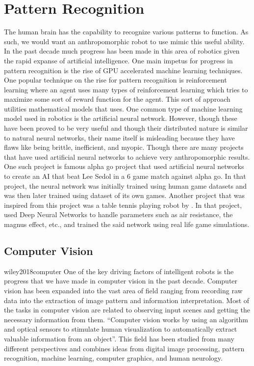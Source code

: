 \documentclass[conference]{IEEEtran}
\begin{document}
\section{Pattern Recognition}
The human brain has the capability to recognize various patterns to function. As such, we would want an anthropomorphic robot to use mimic this useful ability. In the past decade much progress has been made in this area of robotics given the rapid expanse of artificial intelligence. One main impetus for progress in pattern recognition is the rise of GPU accelerated machine learning techniques. One popular technique on the rise for pattern recognition is reinforcement learning where an agent uses many types of reinforcement learning which tries to maximize some sort of reward function for the agent. This sort of approach utilities mathematical models that uses. One common type of machine learning model used in robotics is the artificial neural network. However, though these have been proved to be very useful and though their distributed nature is similar to natural neural networks, their name itself is misleading because they have flaws like being brittle, inefficient, and myopic\autocite{Watson2019}. Though there are many projects that have used artificial neural networks to achieve very anthropomorphic results. One such project is famous alpha go project that used artificial neural networks to create an AI that beat Lee Sedol in a 6 game match against alpha go\autocite{silver2017mastering}. In that project, the neural network was initially trained using human game datasets and was then later trained using dataset of its own games\autocite{silver2017mastering}. Another project that was inspired from this project was a table tennis playing robot by \textcite{lin2020}. In that project, \textcite{lin2020} used Deep Neural Networks to handle parameters such as air resistance, the magnus effect, etc., and trained the said network using real life game simulations.

\subsection{Computer Vision}
wiley2018computer
One of the key driving factors of intelligent robots is the progress that we have made in computer vision in the past decade. Computer vision has been expanded into the vast area of field ranging from recording raw data into the extraction of image pattern and information interpretation\autocite{patel2012machine}. Most of the tasks in computer vision are related to observing input scenes and getting the necessary information from them. ``Computer vision works by using an algorithm and optical sensors to stimulate human visualization to automatically extract valuable information from an object''\autocite{wiley2018computer}. This field has been studied from many different perspectives and combines ideas from digital image processing, pattern recognition, machine learning, computer graphics, and human neurology. 
\end{document}
